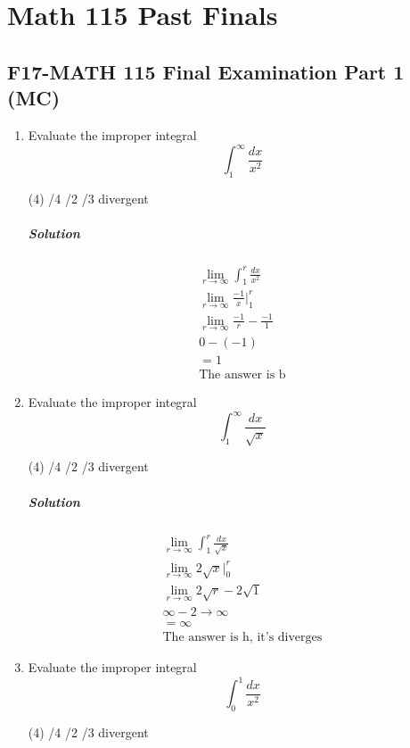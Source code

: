 \documentclass[MATH-115-Notes.tex]{subfiles}
\begin{document}
\onecolumn
\chapter{Math 115 Past Finals}
\section{F17-MATH 115 Final Examination Part 1 (MC)}
\begin{enumerate}[itemsep=5mm]
    
    \item Evaluate the improper integral \[\int_{1}^{\infty}\frac{dx}{x^2}\]
    \begin{tasks}(4)
        /4  
        /2
        /3
        \task divergent
    \end{tasks}
    \paragraph*{Solution}
    \begin{gather*}
        \lim_{r \to \infty}\int_{1}^{r}\frac{dx}{x^2}\\
        \lim_{r \to \infty} \frac{-1}{x}\Big|_1^r\\
        \lim_{r \to \infty} \frac{-1}{r} - \frac{-1}{1}\\
        0 - (-1)\\
        = 1\\
        \text{The answer is b}
    \end{gather*}
    
    \item Evaluate the improper integral \[\int_{1}^{\infty}\frac{dx}{\sqrt{x}}\]
    \begin{tasks}(4)
        /4  
        /2
        /3
        \task divergent
    \end{tasks}
    \paragraph*{Solution}
    \begin{gather*}
        \lim_{r \to \infty}\int_{1}^{r}\frac{dx}{\sqrt{x}}\\
        \lim_{r \to \infty} 2\sqrt{x}\Big|_0^r\\
        \lim_{r \to \infty} 2\sqrt{r} - 2\sqrt{1}\\
        \infty - 2 \rightarrow \infty\\
        = \infty\\
        \text{The answer is h, it's diverges}
    \end{gather*}
    \item Evaluate the improper integral \[\int_{0}^{1}\frac{dx}{x^2}\]
    \begin{tasks}(4)
        /4  
        /2
        /3
        \task divergent
    \end{tasks}

\end{enumerate}
\end{document}
